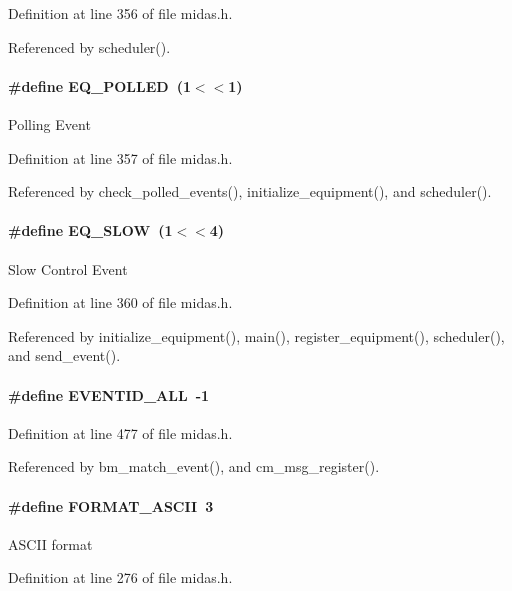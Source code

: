 Definition at line 356 of file midas.h.

Referenced by scheduler().
\paragraph[{EQ\_\-POLLED}]{\setlength{\rightskip}{0pt plus 5cm}\#define EQ\_\-POLLED~(1$<$$<$1)}\hfill\label{group__mdefineh_ga0c716a0a98b5da8bbe8477839d9b0c78}
Polling Event 

Definition at line 357 of file midas.h.

Referenced by check\_\-polled\_\-events(), initialize\_\-equipment(), and scheduler().
\paragraph[{EQ\_\-SLOW}]{\setlength{\rightskip}{0pt plus 5cm}\#define EQ\_\-SLOW~(1$<$$<$4)}\hfill\label{group__mdefineh_gafffdc5135b2e8f3c6bc61b8701084df6}
Slow Control Event 

Definition at line 360 of file midas.h.

Referenced by initialize\_\-equipment(), main(), register\_\-equipment(), scheduler(), and send\_\-event().
\paragraph[{EVENTID\_\-ALL}]{\setlength{\rightskip}{0pt plus 5cm}\#define EVENTID\_\-ALL~-\/1}\hfill\label{group__mdefineh_gabd88aa902705997125b541db3b94578c}


Definition at line 477 of file midas.h.

Referenced by bm\_\-match\_\-event(), and cm\_\-msg\_\-register().
\paragraph[{FORMAT\_\-ASCII}]{\setlength{\rightskip}{0pt plus 5cm}\#define FORMAT\_\-ASCII~3}\hfill\label{group__mdefineh_gaf900017aedf1bdc7e50fcbf949464e6d}
ASCII format 

Definition at line 276 of file midas.h.
